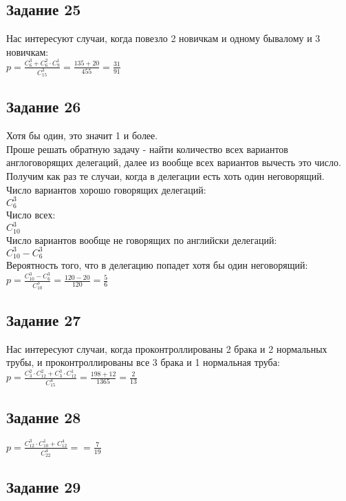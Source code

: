 \documentclass[12pt]{article}
\begin{document}
\newpage
\subsection{Задание 25}

Нас интересуют случаи, когда повезло 2 новичкам и одному бывалому и 3 новичкам:\\
$
p=\frac{C_{6}^3+C_{6}^2\cdot C_{9}^1}{C_{15}^3}
=\frac{135+20}{455}=\frac{31}{91}
$


\newpage
\subsection{Задание 26}
Хотя бы один, это значит 1 и более.\\
Проше решать обратную задачу - найти количество всех вариантов англоговорящих делегаций, далее из вообще всех вариантов вычесть это число. Получим как раз те случаи, когда в делегации есть хоть один неговорящий.
Число вариантов хорошо говорящих делегаций:\\
$
C_{6}^3
$\\
Число всех:\\
$
C_{10}^3
$\\
Число вариантов вообще не говорящих по английски делегаций:\\
$
C_{10}^3-C_{6}^3
$\\
Вероятность того, что в делегацию попадет хотя бы один неговорящий:\\
$
p=\frac{C_{10}^3-C_{6}^3}{C_{10}^3}=
\frac{120-20}{120}=\frac{5}{6}
$

\newpage
\subsection{Задание 27}

Нас интересуют случаи, когда проконтроллированы 2 брака и 2 нормальных трубы, и проконтроллированы все 3 брака и 1 нормальная труба:\\
$
p=\frac{C_{3}^2\cdot C_{12}^2+C_{3}^3\cdot C_{12}^1}{C_{15}^4}=
\frac{198+12}{1365}=
\frac{2}{13}
$

\newpage
\subsection{Задание 28}

$
p=\frac{C_{12}^3\cdot C_{10}^1+C_{12}^4}{C_{22}^4}=
=\frac{7}{19}
$

\newpage
\subsection{Задание 29}
\end{document}
